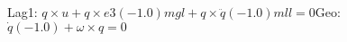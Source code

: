 Lag1: $q\times u+q\times e3 (-1.0) m g l+q\times \ddot{q} (-1.0) m l l = 0$Geo: $\dot{q} (-1.0)+\omega \times q = 0$